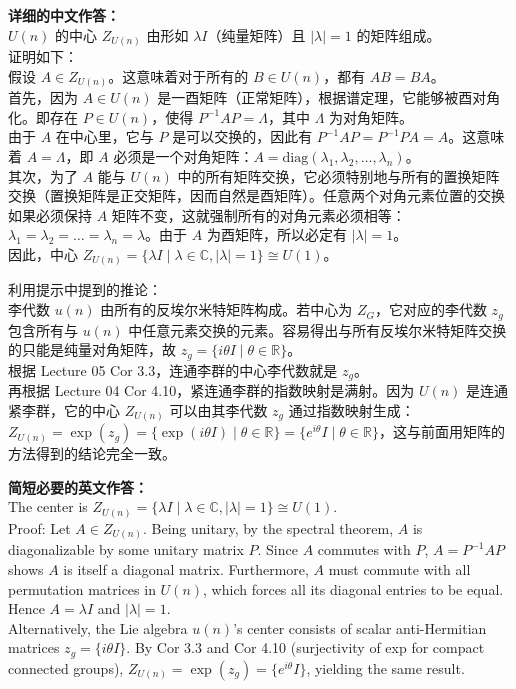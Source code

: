 \documentclass{ctexart}
\begin{document}
\vspace{1em}
\textbf{详细的中文作答：}\\
$U(n)$ 的中心 $Z_{U(n)}$ 由形如 $\lambda I$（纯量矩阵）且 $|\lambda|=1$ 的矩阵组成。\\
证明如下：\\
假设 $A \in Z_{U(n)}$。这意味着对于所有的 $B \in U(n)$，都有 $AB = BA$。\\
首先，因为 $A \in U(n)$ 是一酉矩阵（正常矩阵），根据谱定理，它能够被酉对角化。即存在 $P \in U(n)$，使得 $P^{-1}AP = \Lambda$，其中 $\Lambda$ 为对角矩阵。\\
由于 $A$ 在中心里，它与 $P$ 是可以交换的，因此有 $P^{-1}AP = P^{-1}PA = A$。这意味着 $A = \Lambda$，即 $A$ 必须是一个对角矩阵：$A = \text{diag}(\lambda_1, \lambda_2, \dots, \lambda_n)$。\\
其次，为了 $A$ 能与 $U(n)$ 中的所有矩阵交换，它必须特别地与所有的置换矩阵交换（置换矩阵是正交矩阵，因而自然是酉矩阵）。任意两个对角元素位置的交换如果必须保持 $A$ 矩阵不变，这就强制所有的对角元素必须相等：$\lambda_1 = \lambda_2 = \dots = \lambda_n = \lambda$。由于 $A$ 为酉矩阵，所以必定有 $|\lambda|=1$。\\
因此，中心 $Z_{U(n)} = \{ \lambda I \mid \lambda \in \mathbb{C}, |\lambda| = 1 \} \cong U(1)$。

利用提示中提到的推论：\\
李代数 $u(n)$ 由所有的反埃尔米特矩阵构成。若中心为 $Z_G$，它对应的李代数 $z_g$ 包含所有与 $u(n)$ 中任意元素交换的元素。容易得出与所有反埃尔米特矩阵交换的只能是纯量对角矩阵，故 $z_g = \{ i\theta I \mid \theta \in \mathbb{R} \}$。\\
根据 Lecture 05 Cor 3.3，连通李群的中心李代数就是 $z_g$。\\
再根据 Lecture 04 Cor 4.10，紧连通李群的指数映射是满射。因为 $U(n)$ 是连通紧李群，它的中心 $Z_{U(n)}$ 可以由其李代数 $z_g$ 通过指数映射生成：\\
$Z_{U(n)} = \exp(z_g) = \{ \exp(i\theta I) \mid \theta \in \mathbb{R} \} = \{ e^{i\theta} I \mid \theta \in \mathbb{R} \}$，这与前面用矩阵的方法得到的结论完全一致。

\vspace{1em}
\textbf{简短必要的英文作答：}\\
The center is $Z_{U(n)} = \{ \lambda I \mid \lambda \in \mathbb{C}, |\lambda|=1 \} \cong U(1)$.\\
Proof: Let $A \in Z_{U(n)}$. Being unitary, by the spectral theorem, $A$ is diagonalizable by some unitary matrix $P$. Since $A$ commutes with $P$, $A = P^{-1} A P$ shows $A$ is itself a diagonal matrix. Furthermore, $A$ must commute with all permutation matrices in $U(n)$, which forces all its diagonal entries to be equal. Hence $A = \lambda I$ and $|\lambda|=1$.\\
Alternatively, the Lie algebra $u(n)$'s center consists of scalar anti-Hermitian matrices $z_g = \{ i\theta I \}$. By Cor 3.3 and Cor 4.10 (surjectivity of exp for compact connected groups), $Z_{U(n)} = \exp(z_g) = \{ e^{i\theta} I \}$, yielding the same result.
\end{document}
